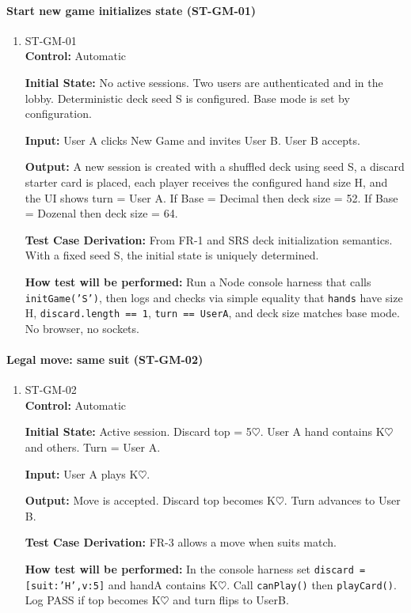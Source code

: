 \documentclass[12pt, titlepage]{article}
\begin{document}
\paragraph{Start new game initializes state (ST-GM-01)}
\begin{enumerate}
\item{ST-GM-01\\}
\textbf{Control:} Automatic

\textbf{Initial State:} No active sessions. Two users are authenticated and in the lobby. Deterministic deck seed S is configured. Base mode is set by configuration.

\textbf{Input:} User A clicks New Game and invites User B. User B accepts.

\textbf{Output:} A new session is created with a shuffled deck using seed S, a discard starter card is placed, each player receives the configured hand size H, and the UI shows turn = User A. If Base = Decimal then deck size = 52. If Base = Dozenal then deck size = 64.

\textbf{Test Case Derivation:} From FR-1 and SRS deck initialization semantics. With a fixed seed S, the initial state is uniquely determined.

\textbf{How test will be performed:} Run a Node console harness that calls \texttt{initGame('S')}, then logs and checks via simple equality that \texttt{hands} have size H, \texttt{discard.length == 1}, \texttt{turn == UserA}, and deck size matches base mode. No browser, no sockets.
\end{enumerate}

\paragraph{Legal move: same suit (ST-GM-02)}
\begin{enumerate}
\item{ST-GM-02\\}
\textbf{Control:} Automatic

\textbf{Initial State:} Active session. Discard top = 5$\heartsuit$. User A hand contains K$\heartsuit$ and others. Turn = User A.

\textbf{Input:} User A plays K$\heartsuit$.

\textbf{Output:} Move is accepted. Discard top becomes K$\heartsuit$. Turn advances to User B.

\textbf{Test Case Derivation:} FR-3 allows a move when suits match.

\textbf{How test will be performed:} In the console harness set \texttt{discard = [{suit:'H',v:5}]} and handA contains K$\heartsuit$. Call \texttt{canPlay()} then \texttt{playCard()}. Log PASS if top becomes K$\heartsuit$ and turn flips to UserB.
\end{enumerate}
\end{document}
